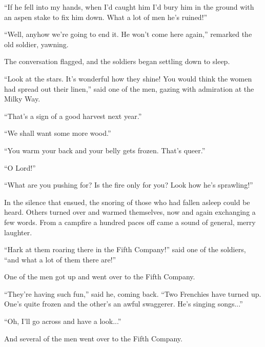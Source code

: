 ``If he fell into my hands, when I'd caught him I'd bury him in
the ground with an aspen stake to fix him down. What a lot of men
he's ruined!''

``Well, anyhow we're going to end it. He won't come here again,''
remarked the old soldier, yawning.

The conversation flagged, and the soldiers began settling down to
sleep.

``Look at the stars. It's wonderful how they shine! You would
think the women had spread out their linen,'' said one of the
men, gazing with admiration at the Milky Way.

``That's a sign of a good harvest next year.''

``We shall want some more wood.''

``You warm your back and your belly gets frozen. That's queer.''

``O Lord!''

``What are you pushing for? Is the fire only for you? Look how
he's sprawling!''

In the silence that ensued, the snoring of those who had fallen
asleep could be heard. Others turned over and warmed themselves,
now and again exchanging a few words. From a campfire a hundred
paces off came a sound of general, merry laughter.

``Hark at them roaring there in the Fifth Company!'' said one of
the soldiers, ``and what a lot of them there are!''

One of the men got up and went over to the Fifth Company.

``They're having such fun,'' said he, coming back. ``Two
Frenchies have turned up. One's quite frozen and the other's an
awful swaggerer. He's singing songs...''

``Oh, I'll go across and have a look...''

And several of the men went over to the Fifth Company.



